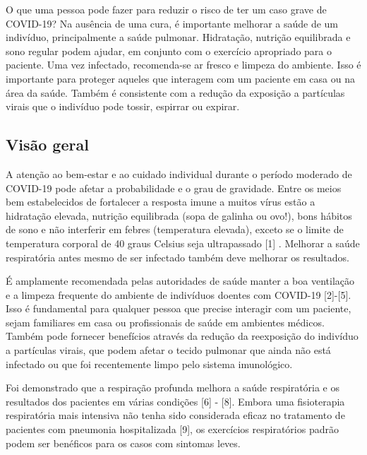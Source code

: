 \documentclass[onecolumn,journal]{IEEEtran}
\begin{document}

O que uma pessoa pode fazer para reduzir o risco de ter um caso grave de COVID-19? Na ausência de uma cura, é importante melhorar a saúde de um indivíduo, principalmente a saúde pulmonar. Hidratação, nutrição equilibrada e sono regular podem ajudar, em conjunto com o exercício apropriado para o paciente. Uma vez infectado, recomenda-se ar fresco e limpeza do ambiente. Isso é importante para proteger aqueles que interagem com um paciente em casa ou na área da saúde. Também é consistente com a redução da exposição a partículas virais que o indivíduo pode tossir, espirrar ou expirar.

\begin{multicols}{2}
\section*{Visão geral}

A atenção ao bem-estar e ao cuidado individual durante o período moderado de COVID-19 pode afetar a probabilidade e o grau de gravidade. Entre os meios bem estabelecidos de fortalecer a resposta imune a muitos vírus estão a hidratação elevada, nutrição equilibrada (sopa de galinha ou ovo!), bons hábitos de sono e não interferir em febres (temperatura elevada), exceto se o limite de temperatura corporal de 40 graus Celsius seja ultrapassado [1] . Melhorar a saúde respiratória antes mesmo de ser infectado também deve melhorar os resultados.

É amplamente recomendada pelas autoridades de saúde manter a boa ventilação e a limpeza frequente do ambiente de indivíduos doentes com COVID-19 [2]-[5]. Isso é fundamental para qualquer pessoa que precise interagir com um paciente, sejam familiares em casa ou profissionais de saúde em ambientes médicos. Também pode fornecer benefícios através da redução da reexposição do indivíduo a partículas virais, que podem afetar o tecido pulmonar que ainda não está infectado ou que foi recentemente limpo pelo sistema imunológico.

Foi demonstrado que a respiração profunda melhora a saúde respiratória e os resultados dos pacientes em várias condições [6] - [8]. Embora uma fisioterapia respiratória mais intensiva não tenha sido considerada eficaz no tratamento de pacientes com pneumonia hospitalizada [9], os exercícios respiratórios padrão podem ser benéficos para os casos com sintomas leves.


\end{multicols}
\end{document}
